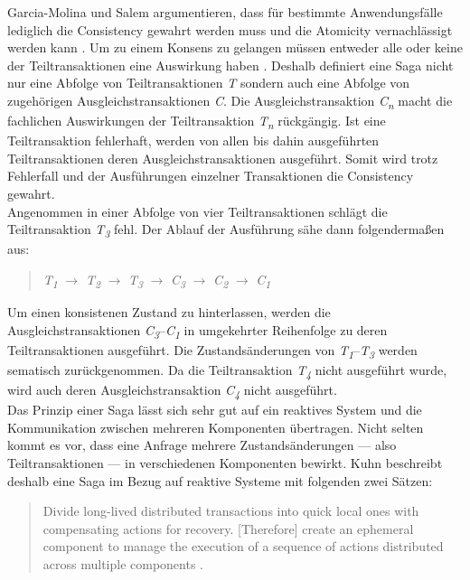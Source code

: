 \pagebreak

Garcia-Molina und Salem argumentieren, dass für bestimmte Anwendungsfälle lediglich die Consistency gewahrt werden muss und die Atomicity vernachlässigt werden kann \cite[S.~250]{garcia-molina_sagas_1987}. Um zu einem Konsens zu gelangen müssen entweder alle oder keine der Teiltransaktionen eine Auswirkung haben \cite[S.~250]{garcia-molina_sagas_1987}. Deshalb definiert eine Saga nicht nur eine Abfolge von Teiltransaktionen \textit{T} sondern auch eine Abfolge von zugehörigen Ausgleichstransaktionen \textit{C}. Die Ausgleichstransaktion \textit{C\textsubscript{n}} macht die fachlichen Auswirkungen der Teiltransaktion \textit{T\textsubscript{n}} rückgängig. Ist eine Teiltransaktion fehlerhaft, werden von allen bis dahin ausgeführten Teiltransaktionen deren Ausgleichstransaktionen ausgeführt. Somit wird trotz Fehlerfall und der Ausführungen einzelner Transaktionen die Consistency gewahrt.\\
Angenommen in einer Abfolge von vier Teiltransaktionen schlägt die Teiltransaktion \textit{T\textsubscript{3}} fehl. Der Ablauf der Ausführung sähe dann folgendermaßen aus:

\begin{quotation}
\textit{T\textsubscript{1}} $\rightarrow$ \textit{T\textsubscript{2}} $\rightarrow$ \textit{T\textsubscript{3}}\,\textdagger\,$\rightarrow$ \textit{C\textsubscript{3}} $\rightarrow$ \textit{C\textsubscript{2}} $\rightarrow$ \textit{C\textsubscript{1}}
\end{quotation}

Um einen konsistenen Zustand zu hinterlassen, werden die Ausgleichstransaktionen \textit{C\textsubscript{3}}--\textit{C\textsubscript{1}} in umgekehrter Reihenfolge zu deren Teiltransaktionen ausgeführt. Die Zustandsänderungen von \textit{T\textsubscript{1}}--\textit{T\textsubscript{3}} werden sematisch zurückgenommen. Da die Teiltransaktion \textit{T\textsubscript{4}} nicht ausgeführt wurde, wird auch deren Ausgleichstransaktion \textit{C\textsubscript{4}} nicht ausgeführt.\\

Das Prinzip einer Saga lässt sich sehr gut auf ein reaktives System und die Kommunikation zwischen mehreren Komponenten übertragen. Nicht selten kommt es vor, dass eine Anfrage mehrere Zustandsänderungen --- also Teiltransaktionen --- in verschiedenen Komponenten bewirkt. Kuhn beschreibt deshalb eine Saga im Bezug auf reaktive Systeme mit folgenden zwei Sätzen:

\begin{quotation}
Divide long-lived distributed transactions into quick local ones with compensating actions for recovery. [Therefore] create an ephemeral component to manage the execution of a sequence of actions distributed across multiple components \cite[S.~307]{kuhn_reactive_2015}.
\end{quotation}

